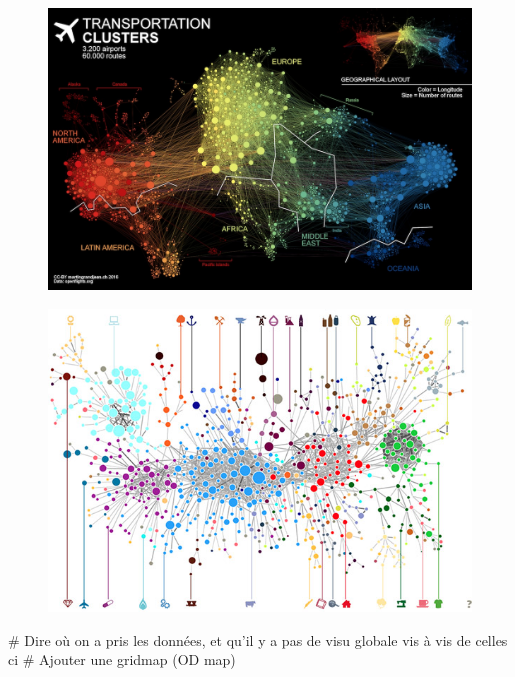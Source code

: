 \documentclass{vgtc}
\begin{document}
\begin{figure}[H]
\center
\includegraphics[scale=0.15]{airports-network-small.jpg}
\end{figure}

\begin{figure}[H]
\center
\includegraphics[scale=0.4]{economic_growth_atlas2.jpg}
\end{figure}

# Dire où on a pris les données, et qu'il y a pas de visu globale vis à vis de celles ci
# Ajouter une gridmap (OD map)
\end{document}
